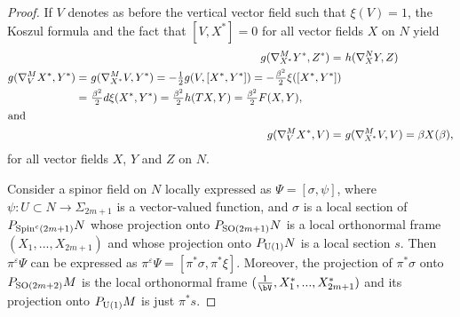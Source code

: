 \documentclass[12pt]{amsart}
\begin{document}
\begin{proof} 
If $V$ denotes as before the vertical vector field such that
$\xi(V)=1$, the Koszul formula and the fact that
$[V,{{X^*}}]=0$ for all vector fields $X$ on $N$ yield 
\begin{align}
\label{a1}	g({\nabla}^M_{{X^*}}{{Y^*}},{{Z^*}})=&\ h({\nabla}^N_XY,Z)\\
\label{a2}	\begin{split}g({\nabla}^M_V{{X^*}} ,{{Y^*}}) =&\ g({\nabla}^M_{{X^*}}
  V,{{Y^*}})=-\tfrac12g(V,[{{X^*}},{{Y^*}}])=-\tfrac{{\beta}^2}2\xi([{{X^*}},{{Y^*}}]) \\
=&\ \tfrac{{\beta}^2}2d\xi({{X^*}},{{Y^*}})=\tfrac{{\beta}^2}2h(TX,Y)=\tfrac{{\beta}^2}2 F(X,Y),
\end{split}\\
\intertext{and} 
\label{a3}g({\nabla}^M_V{{X^*}} ,V)=&\ g({\nabla}^M_{{X^*}} V,V)={\beta} X({\beta}),
\end{align}
for all vector fields $X$, $Y$ and $Z$ on $N$.

Consider a spinor field on $N$ locally expressed as ${\Psi}=[\sigma,\psi]$,
where $\psi:U\subset N\to\Sigma_{2m+1}$ is a vector-valued function,
and $\sigma$ is a local section of ${P_{{{\rm Spin}}^c(2m+1)}N}$ whose projection onto
${P_{{{\rm SO}}(2m+1)}N}$ is a local orthonormal frame $(X_1,...,X_{2m+1})$ and whose
projection onto ${P_{{{\rm U}}(1)}N}$ is a local section $s$. Then $\pi^{\varepsilon}{\Psi}$ can be
expressed as $\pi^{\varepsilon}{\Psi}=[\pi^*\sigma,\pi^*\xi]$. Moreover, 
the projection of $\pi^*\sigma$ onto ${P_{{{\rm SO}}(2m+2)}M}$ is the local
orthonormal frame $(\frac{1}\bV,X_1^*,...,X_{2m+1}^*)$ and its
projection onto ${P_{{{\rm U}}(1)}M}$ is just $\pi^*s$.  


\end{proof}
\end{document}
